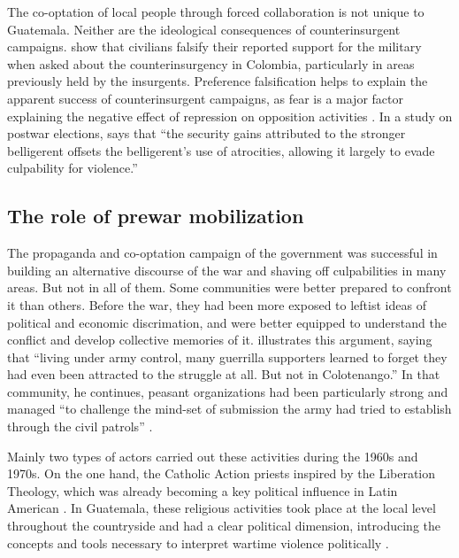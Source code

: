 \documentclass[12pt, notitlepage]{article}
\begin{document}
The co-optation of local people through forced collaboration is not unique to Guatemala.
Neither are the ideological consequences of counterinsurgent campaigns.
\citet{Matanock:2018aa} show that civilians falsify their reported support for the military when asked about the counterinsurgency in Colombia, particularly in areas previously held by the insurgents.
Preference falsification helps to explain the apparent success of counterinsurgent campaigns, as fear is a major factor explaining the negative effect of repression on opposition activities \citep{Young:2019aa}.
In a study on postwar elections, \citet[749]{Daly:2019aa} says that ``the security gains attributed to the stronger belligerent offsets the belligerent's use of atrocities, allowing it largely to evade culpability for violence.''

\subsection*{The role of prewar mobilization}

The propaganda and co-optation campaign of the government was successful in building an alternative discourse of the war and shaving off culpabilities in many areas.
But not in all of them.
Some communities were better prepared to confront it than others.
Before the war, they had been more exposed to leftist ideas of political and economic discrimation, and were better equipped to understand the conflict and develop collective memories of it.
\citet[223]{Kobrak:2013aa} illustrates this argument, saying that ``living under army control, many guerrilla supporters learned to forget they had even been attracted to the struggle at all. But not in Colotenango.''
In that community, he continues, peasant organizations had been particularly strong and managed ``to challenge the mind-set of submission the army had tried to establish through the civil patrols'' \citep[226]{Kobrak:2013aa}.

Mainly two types of actors carried out these activities during the 1960s and 1970s.
On the one hand, the Catholic Action priests inspired by the Liberation Theology, which was already becoming a key political influence in Latin American \citep[e.g.][]{Wood:2003aa}.
In Guatemala, these religious activities took place at the local level throughout the countryside and had a clear political dimension, introducing the concepts and tools necessary to interpret wartime violence politically \citep{Carmack:1988aa, Manz:1988aa, Manz:2004aa, LeBot:1992aa, Bateson:2013aa}.
\end{document}
